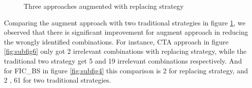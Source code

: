 \documentclass{sig-alternate}
\begin{document}
\begin{figure}[ht]
\centering
{}
\caption[Optional caption for list of figures]{Three approaches augmented with replacing strategy}
\label{fig:subfigureExample2}
\end{figure}


Comparing the augment approach with two traditional strategies in figure \ref{fig:subfigureExample2}, we observed that there is significant improvement for augment approach in reducing the wrongly identified combinations. For instance, CTA approach in figure \ref{fig:subfig6} only got 2 irrelevant combinations with replacing strategy, while the traditional two strategy get 5 and 19 irrelevant combinations respectively. And for FIC\_BS in figure \ref{fig:subfig4} this comparison is 2 for replacing strategy, and 2 , 61 for two traditional strategies.
\end{document}
